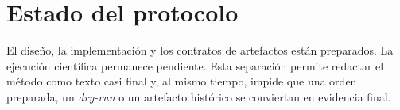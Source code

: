 \section{Estado del protocolo}

El diseño, la implementación y los contratos de artefactos están preparados. La ejecución científica permanece pendiente. Esta separación permite redactar el método como texto casi final y, al mismo tiempo, impide que una orden preparada, un \emph{dry-run} o un artefacto histórico se conviertan en evidencia final.

